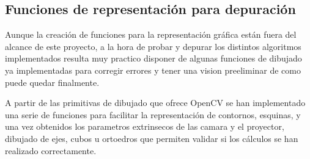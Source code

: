 \subsection{Funciones de representación para depuración}
Aunque la creación de funciones para la representación gráfica están fuera del alcance de este proyecto, a la hora de probar y depurar los distintos algoritmos implementados resulta muy practico disponer de algunas funciones de dibujado ya implementadas para corregir errores y tener una vision preeliminar de como puede quedar finalmente.

A partir de las primitivas de dibujado que ofrece OpenCV se han implementado una serie de funciones para facilitar la representación de contornos, esquinas, y una vez obtenidos los parametros extrinsecos de las camara y el proyector, dibujado de ejes, cubos u ortoedros que permiten validar si los cálculos se han realizado correctamente.





